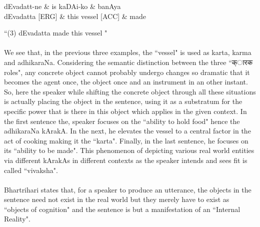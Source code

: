 \documentclass[a4paper,10pt]{article}
\begin{document}
\hypertarget{fig1}{}

\begin{center}
\begin{dependency}[arc edge, arc angle=80, text only label, label style={above}]
   \begin{deptext}[column sep=1em]
      dEvadatt-ne \& is kaDAi-ko \& banAya \\
      dEvadatta [ERG] \& this vessel [ACC]  \& made \\
   \end{deptext}
\end{dependency} 

 ``(3) dEvadatta made this vessel " 
 

\end{center}

\paragraph{} We see that, in the previous three examples, the ``vessel" is used as karta, karma and adhikaraNa. 
Considering the semantic distinction between the three ``{\d कारक } roles", any concrete object cannot probably undergo changes so dramatic that 
it becomes the agent once, the object once and an instrument in an other instant. So, here the speaker while shifting the concrete object 
through all these situations is actually placing the object in the sentence, using it as a substratum for the specific power 
that is there in this object which applies in the given context. 
In the first sentence the, speaker focuses on the ``ability to hold food" hence the adhikaraNa kArakA. 
In the next, he elevates the vessel to a central factor in the act of cooking making it the ``karta".
Finally, in the last sentence, he focuses on its ``ability to be made". 
This phenomenon of depicting various real world entities via different kArakAs in different contexts as the speaker intends and sees fit is called ``vivaksha".

\paragraph{} Bhartrihari states that, for a speaker to produce an utterance, the objects in the sentence need not 
exist in the real world but they merely have to exist as ``objects of cognition" and the sentence is but a manifestation of an ``Internal Reality".
\end{document}
